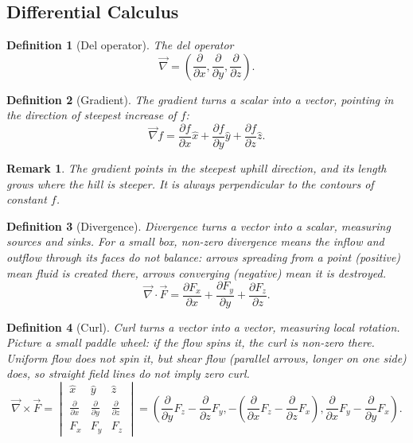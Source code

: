\documentclass{article}
\newtheorem{definition}{Definition}
\newtheorem{remark}{Remark}
\begin{document}
\subsection{Differential Calculus}
\begin{definition}[Del operator]
    The del operator
    \[\vec{\nabla} = \left(\frac{\partial}{\partial x}, \frac{\partial}{\partial y}, \frac{\partial}{\partial z}\right).\]
\end{definition}
\begin{definition}[Gradient]
    The gradient turns a scalar into a vector, pointing in the direction of steepest increase of $f$:
    \begin{equation}
        \vec{\nabla}f = \frac{\partial f}{\partial x}\hat{x} + \frac{\partial f}{\partial y}\hat{y} + \frac{\partial f}{\partial z}\hat{z}.
    \end{equation}
\end{definition}
\begin{remark}
    The gradient points in the steepest uphill direction, and its length grows where the hill is steeper. It is always perpendicular to the contours of constant $f$.
\end{remark}
\begin{definition}[Divergence]
    Divergence turns a vector into a scalar, measuring sources and sinks. For a small box, non-zero divergence means the inflow and outflow through its faces do not balance: arrows spreading from a point (positive) mean fluid is created there, arrows converging (negative) mean it is destroyed.
    \begin{equation}
        \vec{\nabla}\cdot\vec{F} = \frac{\partial F_x}{\partial x} + \frac{\partial F_y}{\partial y} + \frac{\partial F_z}{\partial z}.
    \end{equation}
\end{definition}
\begin{definition}[Curl]
    Curl turns a vector into a vector, measuring local rotation. Picture a small paddle wheel: if the flow spins it, the curl is non-zero there. Uniform flow does not spin it, but shear flow (parallel arrows, longer on one side) does, so straight field lines do not imply zero curl.
    \begin{equation}
        \vec{\nabla}\times\vec{F} = \begin{vmatrix} \hat{x} & \hat{y} & \hat{z} \\[2pt] \frac{\partial}{\partial x} & \frac{\partial}{\partial y} & \frac{\partial}{\partial z} \\[2pt] F_x & F_y & F_z \end{vmatrix} = \left(\frac{\partial}{\partial y}F_z - \frac{\partial}{\partial z}F_y, -(\frac{\partial}{\partial x}F_z - \frac{\partial}{\partial z}F_x), \frac{\partial}{\partial x}F_y - \frac{\partial}{\partial y}F_x\right).
    \end{equation}
\end{definition}
\end{document}
